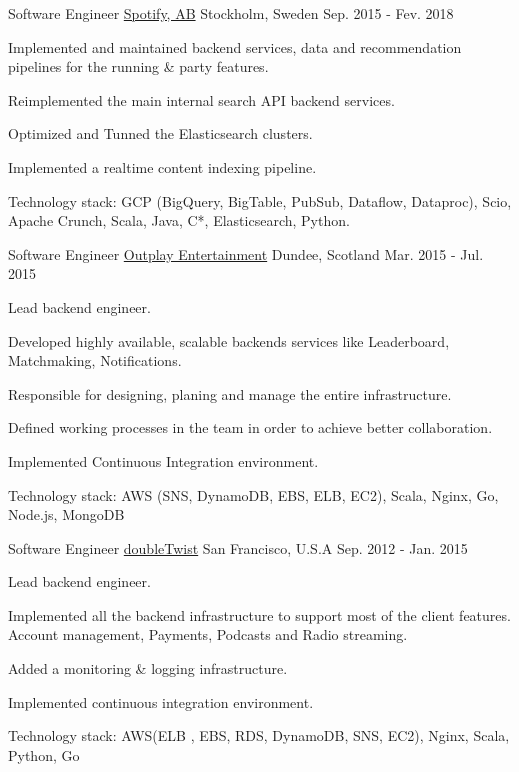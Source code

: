 \begin{cventries}
	\cventry
	{Software Engineer} %
	{\href{https://spotify.com}{Spotify, AB}} %
	{Stockholm, Sweden} %
	{Sep. 2015 - Fev. 2018} %
	{
		\begin{cvitems} %
			\item {Implemented and maintained backend services, data and recommendation pipelines for the running \& party features.}
			\item {Reimplemented the main internal search API backend services.}
			\item {Optimized and Tunned the Elasticsearch clusters.}
			\item {Implemented a realtime content indexing pipeline.}
			\item {Technology stack: GCP (BigQuery, BigTable, PubSub, Dataflow, Dataproc), Scio, Apache Crunch, Scala, Java, C*, Elasticsearch, Python.}
		\end{cvitems}
	}

	\cventry
	{Software Engineer} %
	{\href{https://outplay.com}{Outplay Entertainment}} %
	{Dundee, Scotland} %
	{Mar. 2015 - Jul. 2015} %
	{
		\begin{cvitems} %
			\item {Lead backend engineer.}
			\item {Developed highly available, scalable backends services like Leaderboard, Matchmaking, Notifications.}
			\item {Responsible for designing, planing and manage the entire infrastructure.}
			\item {Defined working processes in the team in order to achieve better collaboration.}
			\item {Implemented Continuous Integration environment.}
			\item {Technology stack: AWS (SNS, DynamoDB, EBS, ELB, EC2), Scala, Nginx, Go, Node.js, MongoDB}
		\end{cvitems}
	}

	\cventry
	{Software Engineer} %
	{\href{https://www.doubletwist.com}{doubleTwist}} %
	{San Francisco, U.S.A} %
	{Sep. 2012 - Jan. 2015} %
	{
		\begin{cvitems} %
			\item {Lead backend engineer.}
			\item {Implemented all the backend infrastructure to support most of the client features. Account management, Payments, Podcasts and Radio streaming.}
			\item {Added a monitoring \& logging infrastructure.}
			\item {Implemented continuous integration environment.}
			\item {Technology stack: AWS(ELB , EBS, RDS, DynamoDB, SNS, EC2), Nginx, Scala, Python, Go}
		\end{cvitems}
	}


\end{cventries}

